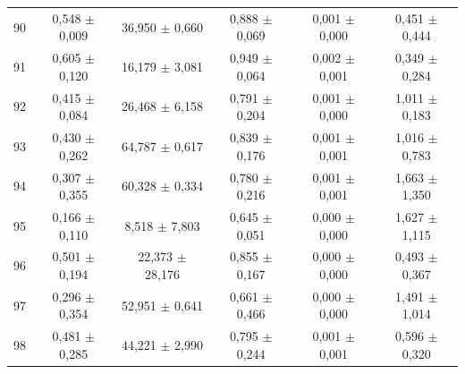 \begin{tabular}{l c c c c c}
90 & 0,548 $\pm$ 0,009 & 36,950 $\pm$ 0,660 & 0,888 $\pm$ 0,069 & 0,001 $\pm$ 0,000 & 0,451 $\pm$ 0,444 \\
91 & 0,605 $\pm$ 0,120 & 16,179 $\pm$ 3,081 & 0,949 $\pm$ 0,064 & 0,002 $\pm$ 0,001 & 0,349 $\pm$ 0,284 \\
92 & 0,415 $\pm$ 0,084 & 26,468 $\pm$ 6,158 & 0,791 $\pm$ 0,204 & 0,001 $\pm$ 0,000 & 1,011 $\pm$ 0,183 \\
93 & 0,430 $\pm$ 0,262 & 64,787 $\pm$ 0,617 & 0,839 $\pm$ 0,176 & 0,001 $\pm$ 0,001 & 1,016 $\pm$ 0,783 \\
94 & 0,307 $\pm$ 0,355 & 60,328 $\pm$ 0,334 & 0,780 $\pm$ 0,216 & 0,001 $\pm$ 0,001 & 1,663 $\pm$ 1,350 \\
95 & 0,166 $\pm$ 0,110 & 8,518 $\pm$ 7,803 & 0,645 $\pm$ 0,051 & 0,000 $\pm$ 0,000 & 1,627 $\pm$ 1,115 \\
96 & 0,501 $\pm$ 0,194 & 22,373 $\pm$ 28,176 & 0,855 $\pm$ 0,167 & 0,000 $\pm$ 0,000 & 0,493 $\pm$ 0,367 \\
97 & 0,296 $\pm$ 0,354 & 52,951 $\pm$ 0,641 & 0,661 $\pm$ 0,466 & 0,000 $\pm$ 0,000 & 1,491 $\pm$ 1,014 \\
98 & 0,481 $\pm$ 0,285 & 44,221 $\pm$ 2,990 & 0,795 $\pm$ 0,244 & 0,001 $\pm$ 0,001 & 0,596 $\pm$ 0,320 \\
\hline 
 \end{tabular}
